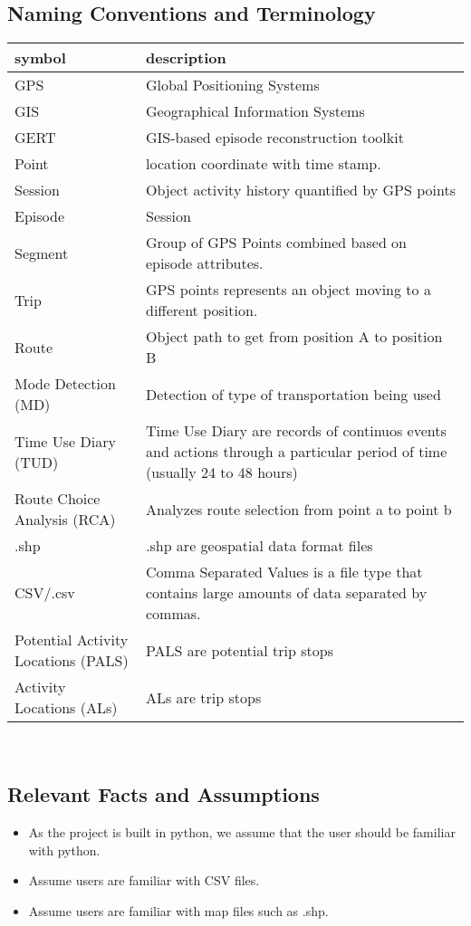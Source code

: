 \documentclass[12pt, titlepage]{article}
\begin{document}
\subsection{Naming Conventions and Terminology}
\begin{tabular}{l p{6cm}} 
  \toprule		
  \textbf{symbol} & \textbf{description}\\
  \midrule 
  GPS & Global Positioning Systems\\
  GIS & Geographical Information Systems\\
  GERT & GIS-based episode reconstruction toolkit \\
  Point & location coordinate with time stamp.\\
  Session & Object activity history quantified by GPS points \\
  Episode & Session\\
  Segment & Group of GPS Points combined based on episode attributes.\\
  Trip & GPS points represents an object moving to a different position.\\
  Route & Object path to get from position A to position B\\
  Mode Detection (MD) & Detection of type of transportation being used \\
  Time Use Diary (TUD) & Time Use Diary are records of continuos events and actions through a particular period of time (usually 24 to 48 hours) \\
  Route Choice Analysis (RCA) &  Analyzes route selection from point a to point b\\
  .shp & .shp are geospatial data format files\\
  CSV/.csv & Comma Separated Values is a file type that contains large amounts of data separated by commas. \\
  Potential Activity Locations (PALS) & PALS are potential trip stops \\
  Activity Locations (ALs) & ALs are trip stops \\


  \bottomrule
\end{tabular}\\

\subsection{Relevant Facts and Assumptions}
\begin{itemize}
    \item As the project is built in python, we assume that the user should be familiar with python.
    \item Assume users are familiar with CSV files.
    \item Assume users are familiar with map files such as .shp.
\end{itemize}
\end{document}

